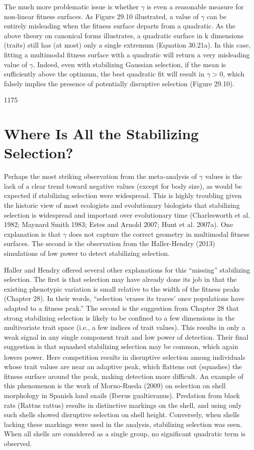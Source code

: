 \documentclass{article}
\begin{document}
The much more problematic issue is whether  $ \gamma $ is even a reasonable measure for non-linear fitness surfaces. As Figure 29.10 illustrated, a value of  $ \gamma $ can be entirely misleading when the fitness surface departs from a quadratic. As the above theory on canonical forms illustrates, a quadratic surface in k dimensions (traits) still has (at most) only a single extremum (Equation 30.21a). In this case, fitting a multimodal fitness surface with a quadratic will return a very misleading value of  $ \gamma $. Indeed, even with stabilizing Gaussian selection, if the mean is sufficiently above the optimum, the best quadratic fit will result in  $ \gamma > 0 $, which falsely implies the presence of potentially disruptive selection (Figure 29.10).

1175

\section{Where Is All the Stabilizing Selection?}
Perhaps the most striking observation from the meta-analysis of  $ \gamma $ values is the lack of a clear trend toward negative values (except for body size), as would be expected if stabilizing selection were widespread. This is highly troubling given the historic view of most ecologists and evolutionary biologists that stabilizing selection is widespread and important over evolutionary time (Charlesworth et al. 1982; Maynard Smith 1983; Estes and Arnold 2007; Hunt et al. 2007a). One explanation is that  $ \gamma $ does not capture the correct geometry in multimodal fitness surfaces. The second is the observation from the Haller-Hendry (2013) simulations of low power to detect stabilizing selection.

Haller and Hendry offered several other explanations for this “missing” stabilizing selection. The first is that selection may have already done its job in that the existing phenotypic variation is small relative to the width of the fitness peaks (Chapter 28). In their words, “selection ‘erases its traces’ once populations have adapted to a fitness peak.” The second is the suggestion from Chapter 28 that strong stabilizing selection is likely to be confined to a few dimensions in the multivariate trait space (i.e., a few indices of trait values). This results in only a weak signal in any single component trait and low power of detection. Their final suggestion is that  $ \underline{\text{squashed stabilizing selection}} $ may be common, which again lowers power. Here competition results in disruptive selection among individuals whose trait values are near an adaptive peak, which flattens out (squashes) the fitness surface around the peak, making detection more difficult. An example of this phenomenon is the work of Morno-Rueda (2009) on selection on shell morphology in Spanish land snails (Iberus gualtieranus). Predation from black rats (Rattus rattus) results in distinctive markings on the shell, and using only such shells showed disruptive selection on shell height. Conversely, when shells lacking these markings were used in the analysis, stabilizing selection was seen. When all shells are considered as a single group, no significant quadratic term is observed.
\end{document}
